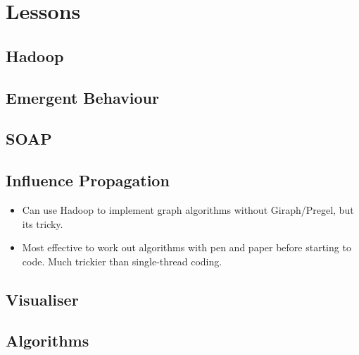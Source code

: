 \section{Lessons}


\subsection{Hadoop}

\subsection{Emergent Behaviour}

\subsection{SOAP}

\subsection{Influence Propagation}

\begin{itemize}
	\item Can use Hadoop to implement graph algorithms without Giraph/Pregel, but its tricky.
	\item Most effective to work out algorithms with pen and paper before starting to code. Much trickier than single-thread coding.
\end{itemize}

\subsection{Visualiser}

\subsection{Algorithms}

